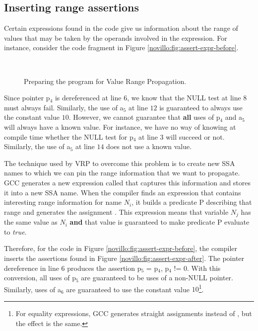 \subsection{Inserting range assertions}

Certain expressions found in the code give us information about
the range of values that may be taken by the operands involved in
the expression.  For instance, consider the code fragment in
Figure \ref{novillo:fig:assert-expr-before}.

\begin{figure}
    \centering
    \ \hspace{3em}
    \caption{Preparing the program for Value Range Propagation.}
\end{figure}

Since pointer p$_4$ is dereferenced at line $6$, we know that the
NULL test at line $8$ must always fail.  Similarly, the use of
a$_5$ at line $12$ is guaranteed to always use the constant value
$10$.  However, we cannot guarantee that \textbf{all} uses of
p$_4$ and a$_5$ will always have a known value.  For instance,
we have no way of knowing at compile time whether the NULL test
for p$_4$ at line $3$ will succeed or not.  Similarly, the use of
a$_5$ at line $14$ does not use a known value.

The technique used by VRP to overcome this problem is to create
new SSA names to which we can pin the range information that we
want to propagate.  GCC generates a new expression called
 that captures this information and stores it
into a new SSA name.  When the compiler finds an expression that
contains interesting range information for name $N_i$, it
builds a predicate P describing that range and generates
the assignment .  This
expression means that variable $N_j$ has the same value as $N_i$
\textbf{and} that value is guaranteed to make predicate P
evaluate to \textit{true}.

Therefore, for the code in Figure
\ref{novillo:fig:assert-expr-before}, the compiler inserts the
assertions found in Figure \ref{novillo:fig:assert-expr-after}.
The pointer dereference in line $6$ produces the assertion
p$_5$ = p$_4$, p$_4$ != $0$\lcode{>}.  With
this conversion, all uses of p$_5$ are guaranteed to be uses of a
non-NULL pointer.  Similarly, uses of a$_6$ are guaranteed to use
the constant value $10$\footnote{For equality expressions, GCC
generates straight assignments instead of ,
but the effect is the same.}.

